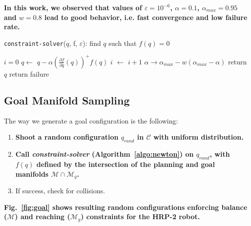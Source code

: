 \documentclass{article}
\newcommand\manifold{\mathcal{M}}
\newcommand\goalmanifold{\mathcal{M}_{g}}
\begin{document}
\textbf{In this work, we observed that values of
  $\varepsilon=10^{-6}$, $\alpha=0.1$, $\alpha_{max}=0.95$ and $w=0.8$
  lead to good behavior, i.e. fast convergence and low failure rate.}

\begin{algorithm}
\caption{\texttt{constraint-solver}($q$, f, $\varepsilon$): find $q$ such that $f(q) = 0$}
\label{algo:newton}
\begin{algorithmic}
\STATE $i=0$
\STATE $q \leftarrow$ $q - \alpha \left(\frac{\partial f}{\partial q}(q)\right)^{+} f(q)$
\STATE $i$ $\leftarrow$ $i+1$
\STATE $\alpha \rightarrow \alpha_{max} - w(\alpha_{max} - \alpha)$
\ENDWHILE
{}
\STATE return $q$
\ELSE
\STATE return failure
\ENDIF
\end{algorithmic}
\end{algorithm}

\subsection{Goal Manifold Sampling}
\label{sec:goal-sampling}

The way we generate a goal configuration is the following:
\begin{enumerate}
\item \textbf{Shoot a random configuration $q_{rand}$ in $\mathcal{C}$ with
  uniform distribution.}
\item \textbf{Call \textit{constraint-solver}
  (Algorithm~\ref{algo:newton}) on $q_{rand}$, with $f(q)$ defined by
  the intersection of the planning and goal manifolds $\manifold \cap
  \goalmanifold$.}
\item If success, check for collisions.
\end{enumerate}

\textbf{Fig.~\ref{fig:goal} shows resulting random configurations
  enforcing balance ($\manifold$) and reaching ($\goalmanifold$)
  constraints for the HRP-2 robot.}
\end{document}
